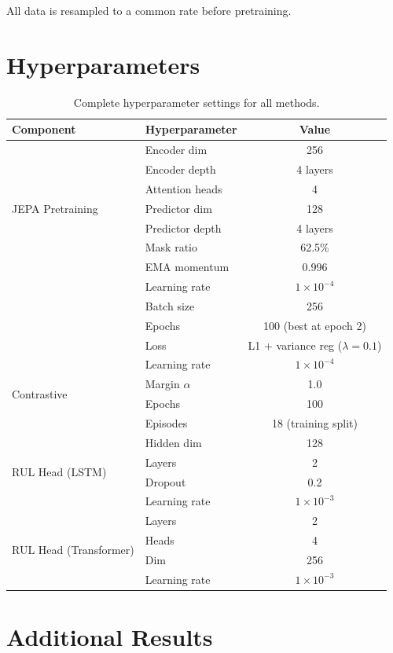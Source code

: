 All data is resampled to a common rate before pretraining.

\section{Hyperparameters}
\label{app:hyperparams}

\begin{table}[h]
\centering
\caption{Complete hyperparameter settings for all methods.}
\label{tab:hyperparams}
\small
\begin{tabular}{@{}llc@{}}
\toprule
Component & Hyperparameter & Value \\
\midrule
\multirow{7}{*}{JEPA Pretraining} & Encoder dim & 256 \\
& Encoder depth & 4 layers \\
& Attention heads & 4 \\
& Predictor dim & 128 \\
& Predictor depth & 4 layers \\
& Mask ratio & 62.5\% \\
& EMA momentum & 0.996 \\
& Learning rate & $1 \times 10^{-4}$ \\
& Batch size & 256 \\
& Epochs & 100 (best at epoch 2) \\
& Loss & L1 + variance reg ($\lambda = 0.1$) \\
\midrule
\multirow{4}{*}{Contrastive} & Learning rate & $1 \times 10^{-4}$ \\
& Margin $\alpha$ & 1.0 \\
& Epochs & 100 \\
& Episodes & 18 (training split) \\
\midrule
\multirow{4}{*}{RUL Head (LSTM)} & Hidden dim & 128 \\
& Layers & 2 \\
& Dropout & 0.2 \\
& Learning rate & $1 \times 10^{-3}$ \\
\midrule
\multirow{4}{*}{RUL Head (Transformer)} & Layers & 2 \\
& Heads & 4 \\
& Dim & 256 \\
& Learning rate & $1 \times 10^{-3}$ \\
\bottomrule
\end{tabular}
\end{table}

\section{Additional Results}
\label{app:additional}

